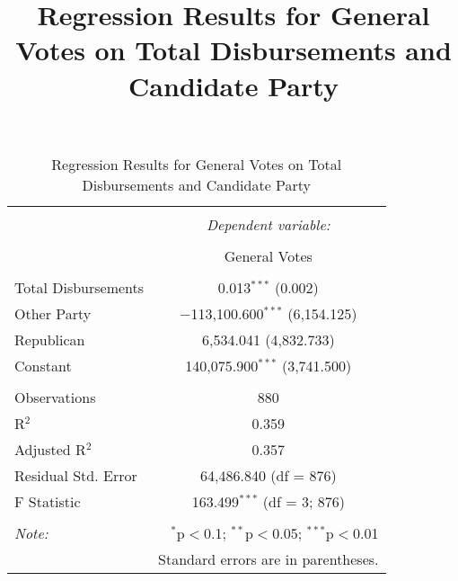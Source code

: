 \documentclass{article}
\begin{document}
\title{Regression Results for General Votes on Total Disbursements and Candidate Party}
\author{}
\date{}
\maketitle

\begin{table}[!htbp] 
\centering 
\caption{Regression Results for General Votes on Total Disbursements and Candidate Party}
\label{table:regression_results}
\begin{tabular}{@{\extracolsep{5pt}}lc} 
\\[-1.8ex]\hline 
\hline \\[-1.8ex] 
 & \multicolumn{1}{c}{\textit{Dependent variable:}} \\ 
\cline{2-2} 
\\[-1.8ex] & General Votes \\ 
\hline \\[-1.8ex] 
 Total Disbursements & 0.013$^{***}$ (0.002) \\ 
  Other Party & $-$113,100.600$^{***}$ (6,154.125) \\ 
  Republican & 6,534.041 (4,832.733) \\ 
  Constant & 140,075.900$^{***}$ (3,741.500) \\ 
 \hline \\[-1.8ex] 
Observations & 880 \\ 
R$^{2}$ & 0.359 \\ 
Adjusted R$^{2}$ & 0.357 \\ 
Residual Std. Error & 64,486.840 (df = 876) \\ 
F Statistic & 163.499$^{***}$ (df = 3; 876) \\ 
\hline 
\hline \\[-1.8ex] 
\textit{Note:}  & \multicolumn{1}{r}{$^{*}$p$<$0.1; $^{**}$p$<$0.05; $^{***}$p$<$0.01} \\ 
 & \multicolumn{1}{r}{Standard errors are in parentheses.} \\ 
\end{tabular} 
\end{table} 
\end{document}
